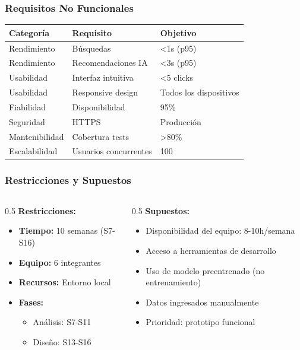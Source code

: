 \documentclass[aspectratio=169]{beamer}
\begin{document}
\begin{frame}
\frametitle{Requisitos No Funcionales}

\begin{table}
\centering
\small
\begin{tabular}{p{4cm}p{4.5cm}p{2cm}}
\toprule
\textbf{Categoría} & \textbf{Requisito} & \textbf{Objetivo} \\
\midrule
Rendimiento & Búsquedas & <1s (p95) \\
Rendimiento & Recomendaciones IA & <3s (p95) \\
Usabilidad & Interfaz intuitiva & <5 clicks \\
Usabilidad & Responsive design & Todos los dispositivos \\
Fiabilidad & Disponibilidad & 95\% \\
Seguridad & HTTPS & Producción \\
Mantenibilidad & Cobertura tests & >80\% \\
Escalabilidad & Usuarios concurrentes & 100 \\
\bottomrule
\end{tabular}
\end{table}

\end{frame}

\begin{frame}
\frametitle{Restricciones y Supuestos}

\begin{columns}
\begin{column}{0.5\textwidth}
\textbf{Restricciones:}
\begin{itemize}
\item \textbf{Tiempo:} 10 semanas (S7-S16)
\item \textbf{Equipo:} 6 integrantes
\item \textbf{Recursos:} Entorno local
\item \textbf{Fases:}
  \begin{itemize}
  \item Análisis: S7-S11
  \item Diseño: S13-S16
  \end{itemize}
\end{itemize}
\end{column}

\begin{column}{0.5\textwidth}
\textbf{Supuestos:}
\begin{itemize}
\item Disponibilidad del equipo: 8-10h/semana
\item Acceso a herramientas de desarrollo
\item Uso de modelo preentrenado (no entrenamiento)
\item Datos ingresados manualmente
\item Prioridad: prototipo funcional
\end{itemize}
\end{column}
\end{columns}

\end{frame}
\end{document}
